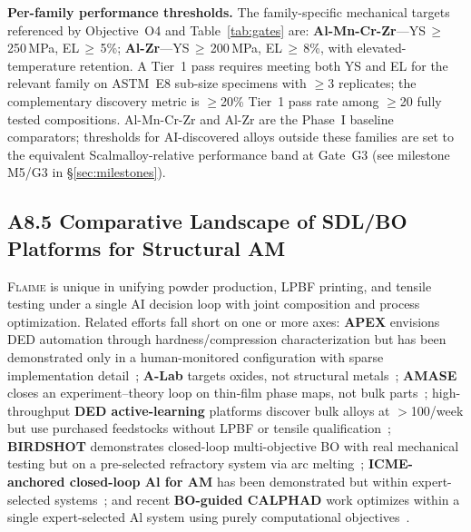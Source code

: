 \documentclass[11pt,letterpaper]{article}
\newif\ifsubmission
\newcommand{\flaime}{\textsc{Flaime}}
\begin{document}
\textbf{Per-family performance thresholds.}
The family-specific mechanical targets referenced by Objective~O4 and
Table~\ref{tab:gates} are: \textbf{Al-Mn-Cr-Zr}---YS\,$\geq$\,250\,MPa,
EL\,$\geq$\,5\%; \textbf{Al-Zr}---YS\,$\geq$\,200\,MPa,
EL\,$\geq$\,8\%, with elevated-temperature retention. A Tier~1 pass
requires meeting both YS and EL for the relevant family on ASTM~E8
sub-size specimens with $\geq$3 replicates; the complementary
discovery metric is $\geq$20\% Tier~1 pass rate among $\geq$20 fully
tested compositions. Al-Mn-Cr-Zr and Al-Zr are the Phase~I
baseline comparators; thresholds for AI-discovered alloys outside
these families are set to the equivalent Scalmalloy-relative
performance band at Gate~G3 (see milestone M5/G3 in \S\ref{sec:milestones}).

\subsection*{A8.5 Comparative Landscape of SDL/BO Platforms for Structural AM}
\flaime{} is unique in unifying powder production, LPBF printing, and
tensile testing under a single AI decision loop with joint composition
and process optimization.  Related efforts fall short on one or more axes:
\textbf{APEX} envisions DED automation through hardness/compression
characterization but has been demonstrated only in a human-monitored
configuration with sparse implementation
detail~\cite{conn_2025_apex};
\textbf{A-Lab} targets oxides, not structural
metals~\cite{szymanski_2023_s4158602};
\textbf{AMASE} closes an experiment--theory loop on thin-film phase
maps, not bulk parts~\cite{liang_2025_sciadvad};
high-throughput \textbf{DED active-learning} platforms discover bulk
alloys at $>$100/week but use purchased feedstocks without LPBF or
tensile qualification~\cite{nelaturu_2024_jmsea202};
\textbf{BIRDSHOT} demonstrates closed-loop multi-objective BO with real
mechanical testing but on a pre-selected refractory system via arc
melting~\cite{paramore_2025_jactamat};
\textbf{ICME-anchored closed-loop Al for AM} has been demonstrated but
within expert-selected systems~\cite{thapliyal_2020_jmtla201}; and
recent \textbf{BO-guided CALPHAD} work optimizes within a single
expert-selected Al system using purely computational
objectives~\cite{glaser_2025_jmps106120}.

\ifsubmission\else
\newpage
\end{document}
